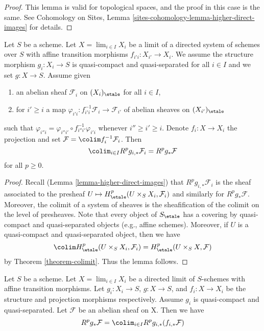 \begin{proof}
This lemma is valid for topological spaces, and the proof in this case is the
same. See
Cohomology on Sites, Lemma
\ref{sites-cohomology-lemma-higher-direct-images}
for details.
\end{proof}

\begin{lemma}
\label{lemma-relative-colimit}
Let $S$ be a scheme. Let $X = \lim_{i \in I} X_i$ be a limit of a
directed system of schemes over $S$ with affine transition morphisms
$f_{i'i} : X_{i'} \to X_i$. We assume the structure morphism
$g_i : X_i \to S$ is quasi-compact and quasi-separated for all $i \in I$
and we set $g : X \to S$. Assume given
\begin{enumerate}
\item an abelian sheaf $\mathcal{F}_i$ on $(X_i)_\etale$ for all $i \in I$,
\item for $i' \geq i$ a map
$\varphi_{i'i} : f_{i'i}^{-1}\mathcal{F}_i \to \mathcal{F}_{i'}$
of abelian sheaves on $(X_{i'})_\etale$
\end{enumerate}
such that $\varphi_{i''i} = \varphi_{i''i'} \circ f_{i'' i'}^{-1}\varphi_{i'i}$
whenever $i'' \geq i' \geq i$.
Denote $f_i : X \to X_i$ the projection and set
$\mathcal{F} = \colim f_i^{-1}\mathcal{F}_i$. Then
$$
\colim_{i\in I} R^p g_{i, *} \mathcal{F}_i = R^p g_* \mathcal{F}
$$
for all $p \geq 0$.
\end{lemma}

\begin{proof}
Recall (Lemma \ref{lemma-higher-direct-images})
that $R^p g_{i, *} \mathcal{F}_i$ is the sheaf associated to the
presheaf $U \mapsto H^p_\etale(U \times_S X_i, \mathcal{F}_i)$
and similarly for $R^pg_*\mathcal{F}$. Moreover, the colimit of a
system of sheaves is the sheafification of the colimit on the level
of presheaves. Note that every object of $S_\etale$ has a covering
by quasi-compact and quasi-separated objects (e.g., affine schemes).
Moreover, if $U$ is a quasi-compact and quasi-separated object,
then we have
$$
\colim H^p_\etale(U \times_S X_i, \mathcal{F}_i) =
H^p_\etale(U \times_S X, \mathcal{F})
$$
by Theorem \ref{theorem-colimit}. Thus the lemma follows.
\end{proof}

\begin{lemma}
\label{lemma-compute-strangely}
Let $S$ be a scheme. Let $X = \lim_{i\in I} X_i$ be a directed limit
of $S$-schemes with affine transition morphisms. Let 
$g_i : X_i \to S$, $g : X \to S$, and $f_i : X \to X_i$ be 
the structure and projection morphisms respectively.
Assume $g_i$ is quasi-compact and quasi-separated.
Let $\mathcal{F}$ be an  abelian sheaf on X. Then we have
$$
R^pg_*\mathcal{F} = \colim_{i \in I} R^pg_{i, *}(f_{i, *}\mathcal{F})
$$
\end{lemma}

